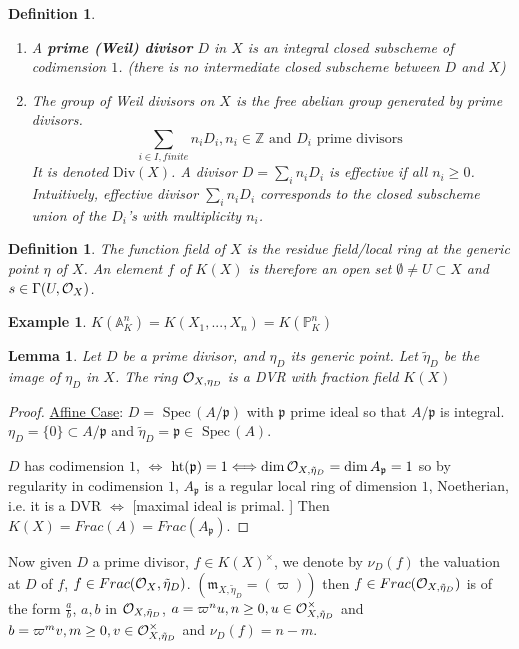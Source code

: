 \documentclass[11pt]{article}
\newtheorem{lemma}[thm]{Lemma}
\newtheorem{dfn}[thm]{Definition}
\newtheorem{ex}[thm]{Example}
\newcommand{\spec}{\text{ Spec}\,}
\newcommand{\affn}{\mathbb A}
\newcommand{\proj}{\mathbb P}
\newcommand{\intg}{\mathbb Z}
\newcommand{\scm}{{\mathfrak m}}
\newcommand{\scp}{{\mathfrak p}}
\newcommand{\calo}{{\cal O}}
\newcommand{\Llrta}{\Longleftrightarrow}
\begin{document}
\begin{dfn}
\ \begin{enumerate}[label=(\arabic*)]
\item  A \textbf{prime (Weil) divisor} $D$ in $X$ is an integral closed subscheme of codimension $1$. (there is no intermediate closed subscheme between $D$ and $X$)
\item The group of Weil divisors on $X$ is the free abelian group generated by  prime divisors.
$$
\sum_{i\in I, finite} n_i D_i
, n_i\in \intg\text{ and } D_i \text{ prime divisors }
$$
It is denoted $\text{Div}(X)$. A divisor $D=\sum_i n_i D_i$ is effective if all $n_i\geq 0$. Intuitively, effective divisor $\sum_i n_i D_i$ corresponds to the closed subscheme union of the $D_i$'s with multiplicity $n_i$.
\end{enumerate}
\end{dfn}
\begin{dfn}
The function field of $X$ is the residue field/local ring at the generic point $\eta$ of $X$. An element $f$ of $K(X)$ is therefore
an open set $\emptyset \neq U\subset X$ and $s\in \Gamma(U,\calo_X)$.
\end{dfn}
\begin{ex}
$K(\affn^n_K)=K(X_1,...,X_n)=K(\proj^n_K)$
\end{ex}
\begin{lemma}
Let $D$ be a prime divisor, and $\eta_D$ its generic point. Let $\tilde{\eta}_D$ be the image of $\eta_D$ in $X$. The ring 
$\calo_{X,\eta_D}$ is a DVR with fraction field $K(X)$
\end{lemma}
\begin{proof}
\underline{Affine Case}: $D=\spec(A/\scp)$ with $\scp$ prime ideal so that $A/\scp$ is integral. $\eta_D=\{0\}\subset A/\scp$ and $\tilde{\eta}_D=\scp\in \spec(A)$.

$D$ has codimension $1$, $\Llrta$ $\text{ht}(\scp)=1\Llrta \dim \calo_{X,\tilde{\eta}_D}=\dim A_\scp=1$ so by regularity in codimension $1$, $A_\scp$ is a regular local ring of dimension $1$, Noetherian, i.e. it is a DVR $\Llrta $ [maximal ideal is primal. ] Then $K(X)=Frac(A)=Frac(A_\scp)$. 
\end{proof}

Now given $D$ a prime divisor, $f\in K(X)^{\times}$, we denote by $\nu_D(f)$ the valuation at $D$ of $f$, $f\in Frac(\calo_X,\tilde{\eta}_D)$. $(\scm_{X,\tilde{\eta}_D} =(\varpi))$ then $f\in Frac(\calo_{X,\tilde{\eta}_D})$ is of the form $\frac{a}{b}$, $a, b$ in $\calo_{X,\tilde{\eta}_D}$, 
$a=\varpi^n u, n\geq 0, u\in\calo_{X,\tilde{\eta}_D}^\times$ and $b=\varpi^m v, m \geq 0, v\in\calo_{X,\tilde{\eta}_D}^\times$ and $\nu_D(f)=n-m$.
\end{document}
